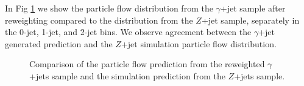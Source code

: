 In Fig \ref{fig:PhotonJetsClosureTest} we show the particle flow \met distribution 
from the $\gamma$+jet sample after reweighting compared to the \met distribution from the 
$Z$+jet sample, separately in the 0-jet, 1-jet, and 2-jet bins. We observe agreement between 
the $\gamma$+jet generated prediction and the $Z$+jet simulation particle flow \met distribution. 

\begin{figure}[!htbp]
\begin{center}
\caption{Comparison of the particle flow \met prediction from the reweighted $\gamma$+jets sample
and the simulation prediction from the $Z$+jets sample.}
\label{fig:PhotonJetsClosureTest}
\end{center}
\end{figure}

